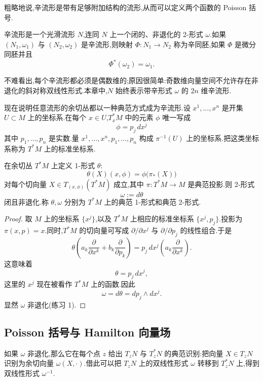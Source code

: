 粗略地说,辛流形是带有足够附加结构的流形,从而可以定义两个函数的 Poisson 括号.

\begin{definition}[辛流形与辛同胚]\label{def:symplectic-manifold}
辛流形是一个光滑流形 $N$,连同 $N$ 上一个闭的、非退化的 2-形式 $\omega$.如果 $(N_1,\omega_1)$ 与 $(N_2,\omega_2)$ 是辛流形,则映射 $\Phi:N_1\to N_2$ 称为辛同胚,如果 $\Phi$ 是微分同胚并且
\[
 \Phi^*(\omega_2)=\omega_1.
\]
\end{definition}

不难看出,每个辛流形都必须是偶数维的;原因很简单:奇数维向量空间不允许存在非退化的斜对称双线性形式.本章中,$N$ 始终表示带辛形式 $\omega$ 的 $2n$ 维辛流形.

现在说明任意流形的余切丛都以一种典范方式成为辛流形.设 $x^1,\ldots,x^n$ 是开集 $U\subset M$ 上的坐标系.在每个 $x\in U$,$T_x^*M$ 中的元素 $\phi$ 唯一写成
\[
 \phi=p_j\,dx^j
\]
其中 $p_1,\ldots,p_n$ 是实数.量 $x^1,\ldots,x^n,p_1,\ldots,p_n$ 构成 $\pi^{-1}(U)$ 上的坐标系.把这类坐标系称为 $T^*M$ 上的标准坐标系.

\begin{example}\label{ex:cotangent-canonical-forms}
在余切丛 $T^*M$ 上定义 1-形式 $\theta$:
\[
 \theta(X)(x,\phi)=\phi\bigl(\pi_*(X)\bigr)
\]
对每个切向量 $X\in T_{(x,\phi)}(T^*M)$ 成立,其中 $\pi:T^*M\to M$ 是典范投影.则 2-形式
\[
 \omega:=d\theta
\]
闭且非退化.称 $\theta,\omega$ 分别为 $T^*M$ 上的典范 1-形式和典范 2-形式.
\end{example}

\begin{proof}
取 $M$ 上的坐标系 $\{x^j\}$,以及 $T^*M$ 上相应的标准坐标系 $\{x^j,p_j\}$.投影为 $\pi(x,p)=x$.同时,$T^*M$ 的切向量可写成 $\partial/\partial x^j$ 与 $\partial/\partial p_j$ 的线性组合.于是
\[
 \theta\left(a_k\frac{\partial}{\partial x^k}
 +b_k\frac{\partial}{\partial p_k}\right)
 =p_j\,dx^j\left(a_k\frac{\partial}{\partial x^k}\right).
\]
这意味着
\[
 \theta=p_j\,dx^j,
\]
这里的 $x^j$ 现在被看作 $T^*M$ 上的函数.因此
\[
 \omega=d\theta=dp_j\wedge dx^j.
\]
显然 $\omega$ 非退化(练习 1).
\end{proof}

\subsection{Poisson 括号与 Hamilton 向量场}
\label{subsec:poisson-hamiltonian-fields}

如果 $\omega$ 非退化,那么它在每个点 $z$ 给出 $T_zN$ 与 $T_z^*N$ 的典范识别:把向量 $X\in T_zN$ 识别为余切向量 $\omega(X,\cdot)$.借此可以把 $T_zN$ 上的双线性形式 $\omega$ 转移到 $T_z^*N$ 上,得到双线性形式 $\omega^{-1}$.

